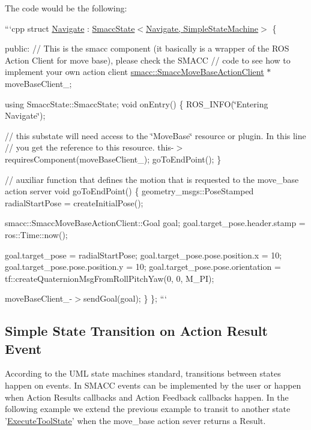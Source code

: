  

The code would be the following\-:

```cpp struct \hyperlink{structNavigate}{Navigate} \-: \hyperlink{classsmacc_1_1SmaccState}{Smacc\-State$<$\-Navigate, Simple\-State\-Machine$>$} \{

public\-: // This is the smacc component (it basically is a wrapper of the R\-O\-S Action Client for move base), please check the S\-M\-A\-C\-C // code to see how to implement your own action client \hyperlink{classsmacc_1_1SmaccMoveBaseActionClient}{smacc\-::\-Smacc\-Move\-Base\-Action\-Client} $\ast$move\-Base\-Client\-\_\-;

using Smacc\-State\-::\-Smacc\-State; void on\-Entry() \{ R\-O\-S\-\_\-\-I\-N\-F\-O(\char`\"{}\-Entering Navigate\char`\"{});

// this substate will need access to the \char`\"{}\-Move\-Base\char`\"{} resource or plugin. In this line // you get the reference to this resource. this-\/$>$requires\-Component(move\-Base\-Client\-\_\-); go\-To\-End\-Point(); \}

// auxiliar function that defines the motion that is requested to the move\-\_\-base action server void go\-To\-End\-Point() \{ geometry\-\_\-msgs\-::\-Pose\-Stamped radial\-Start\-Pose = create\-Initial\-Pose();

smacc\-::\-Smacc\-Move\-Base\-Action\-Client\-::\-Goal goal; goal.\-target\-\_\-pose.\-header.\-stamp = ros\-::\-Time\-::now();

goal.\-target\-\_\-pose = radial\-Start\-Pose; goal.\-target\-\_\-pose.\-pose.\-position.\-x = 10; goal.\-target\-\_\-pose.\-pose.\-position.\-y = 10; goal.\-target\-\_\-pose.\-pose.\-orientation = tf\-::create\-Quaternion\-Msg\-From\-Roll\-Pitch\-Yaw(0, 0, M\-\_\-\-P\-I);

move\-Base\-Client\-\_\--\/$>$send\-Goal(goal); \} \}; ```

\subsection*{Simple State Transition on Action Result Event}

According to the U\-M\-L state machines standard, transitions between states happen on events. In S\-M\-A\-C\-C events can be implemented by the user or happen when Action Results callbacks and Action Feedback callbacks happen. In the following example we extend the previous example to transit to another state '\hyperlink{structExecuteToolState}{Execute\-Tool\-State}' when the move\-\_\-base action sever returns a Result.

